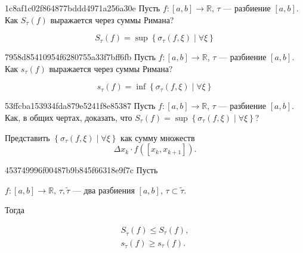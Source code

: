 \begin{note}{1c8af1c02f864877bddd4971a256a30e}
    Пусть \({ f : [a, b] \to \mathbb R }\), \({ \tau }\) --- разбиение \({ [a, b] }\).
    Как \({ S_\tau (f) }\) выражается через суммы Римана?

    \begin{cloze}{1}
        \[
            S_\tau (f) = \sup \left\{ \sigma_\tau (f, \xi) \mid \forall \xi \right\}
        \]
    \end{cloze}
\end{note}

\begin{note}{7958d85410954f6280755a33f7bff6fb}
    Пусть \({ f : [a, b] \to \mathbb R }\), \({ \tau }\) --- разбиение \({ [a, b] }\).
    Как \({ s_\tau (f) }\) выражается через суммы Римана?

    \begin{cloze}{1}
        \[
            s_\tau (f) = \inf \left\{ \sigma_\tau (f, \xi) \mid \forall \xi \right\}
        \]
    \end{cloze}
\end{note}

\begin{note}{53ffcba153934fda879e5241f8e85387}
    Пусть \({ f : [a, b] \to \mathbb R }\), \({ \tau }\) --- разбиение \({ [a, b] }\).
    Как, в общих чертах, доказать, что \({ S_\tau (f) = \sup \left\{ \sigma_\tau (f, \xi) \mid \forall \xi \right\} }\)?

    \begin{cloze}{1}
        Представить \({ \left\{ \sigma_\tau (f, \xi) \mid \forall \xi \right\} }\) как сумму множеств
        \[
            \Delta x_k \cdot f([x_k, x_{k + 1}]).
        \]
    \end{cloze}
\end{note}

\begin{note}{453749996f00487b9b845f66318e9f7c}
    Пусть \begin{icloze}{2}\({ f : [a, b] \to \mathbb R }\),\: \({ \tau, \tilde \tau }\) --- два разбиения \({ [a, b] }\),\: \({ \tau \subset \tilde \tau }\).\end{icloze} Тогда
    \begin{icloze}{1}
        \[
            \begin{gathered}
                S_{\tilde \tau} (f) \leqslant S_\tau (f), \\
                s_{\tilde \tau} (f) \geqslant s_\tau (f).
            \end{gathered}
        \]
    \end{icloze}
\end{note}

